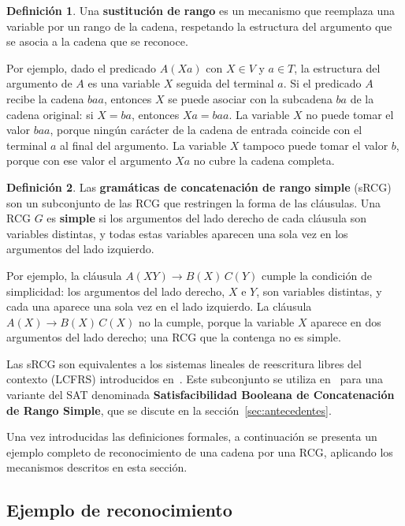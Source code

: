 \documentclass{report}
\theoremstyle{definition}
\newtheorem{definicion}{Definición}[chapter]
\theoremstyle{plain}
\theoremstyle{remark}
\begin{document}
\begin{definicion}
  Una \textbf{sustitución de rango} es un mecanismo que reemplaza una
  variable por un rango de la cadena, respetando la estructura del
  argumento que se asocia a la cadena que se reconoce.
\end{definicion}

Por ejemplo, dado el predicado $A(Xa)$ con $X \in V$ y $a \in T$, la
estructura del argumento de $A$ es una variable $X$ seguida del
terminal $a$. Si el predicado $A$ recibe la cadena $baa$, entonces $X$
se puede asociar con la subcadena $ba$ de la cadena original: si
$X = ba$, entonces $Xa = baa$. La variable $X$ no puede tomar el valor
$baa$, porque ningún carácter de la cadena de entrada coincide con el
terminal $a$ al final del argumento. La variable $X$ tampoco puede
tomar el valor $b$, porque con ese valor el argumento $Xa$ no cubre la
cadena completa.

\begin{definicion}
  Las \textbf{gramáticas de concatenación de rango simple} (sRCG) son un
  subconjunto de las RCG que restringen la forma de las cláusulas. Una
  RCG $G$ es \textbf{simple} si los argumentos del lado derecho de cada
  cláusula son variables distintas, y todas estas variables aparecen una
  sola vez en los argumentos del lado izquierdo.
\end{definicion}

Por ejemplo, la cláusula $A(XY) \to B(X)\, C(Y)$ cumple la condición de
simplicidad: los argumentos del lado derecho, $X$ e $Y$, son variables
distintas, y cada una aparece una sola vez en el lado izquierdo. La
cláusula $A(X) \to B(X)\, C(X)$ no la cumple, porque la variable $X$
aparece en dos argumentos del lado derecho; una RCG que la contenga no
es simple.

Las sRCG son equivalentes a los sistemas lineales de reescritura libres
del contexto (LCFRS) introducidos en~\cite{vijayshanker1987lcfrs}. Este
subconjunto se utiliza en~\cite{aguileralopez2016} para una variante
del SAT denominada \textbf{Satisfacibilidad Booleana de Concatenación
  de Rango Simple}, que se discute en la sección~\ref{sec:antecedentes}.

Una vez introducidas las definiciones formales, a continuación se
presenta un ejemplo completo de reconocimiento de una cadena por una
RCG, aplicando los mecanismos descritos en esta sección.

\subsection{Ejemplo de reconocimiento}
\end{document}
